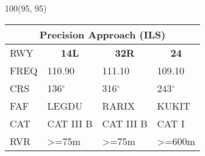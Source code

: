 \documentclass[10pt,landscape,a4paper]{article}
\begin{document}
\begin{textblock}{100}(95, 95)
\begin{table}[]
\begin{tabular}{llll}
\multicolumn{4}{c}{\textbf{Precision Approach (ILS)}} \\ \hline
\multicolumn{1}{|l|}{RWY} & \multicolumn{1}{c|}{\textbf{14L}} & \multicolumn{1}{c|}{\textbf{32R}} & \multicolumn{1}{c|}{\textbf{24}} \\ \hline
\multicolumn{1}{|l|}{FREQ} & \multicolumn{1}{l|}{110.90} & \multicolumn{1}{l|}{111.10} & \multicolumn{1}{l|}{109.10} \\
\multicolumn{1}{|l|}{CRS} & \multicolumn{1}{l|}{136$^\circ$} & \multicolumn{1}{l|}{316$^\circ$} & \multicolumn{1}{l|}{243$^\circ$} \\
\multicolumn{1}{|l|}{FAF} & \multicolumn{1}{l|}{LEGDU} & \multicolumn{1}{l|}{RARIX} & \multicolumn{1}{l|}{KUKIT} \\
\multicolumn{1}{|l|}{CAT} & \multicolumn{1}{l|}{CAT III B} & \multicolumn{1}{l|}{CAT III B} & \multicolumn{1}{l|}{CAT I} \\
\multicolumn{1}{|l|}{RVR} & \multicolumn{1}{l|}{\textgreater{}=75m} & \multicolumn{1}{l|}{\textgreater{}=75m} & \multicolumn{1}{l|}{\textgreater{}=600m} \\ \hline
\end{tabular}
\end{table}
\end{textblock}
\end{document}
